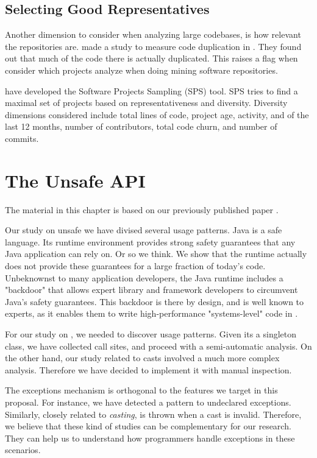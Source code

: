 \section{Selecting Good Representatives \label{org0f368d7}}
\label{sec:org61fe495}
Another dimension to consider when analyzing large codebases, is how relevant the repositories are.
\cite{lopes_dejavu:_2017} made a study to measure code duplication in \github{}.
They found out that much of the code there is actually duplicated.
This raises a flag when consider which projects analyze when doing mining software repositories. 

\cite{nagappan_diversity_2013} have developed the Software Projects Sampling (SPS) tool.
SPS tries to find a maximal set of projects based on representativeness and diversity.
Diversity dimensions considered include total lines of code, project age, activity, and of the last 12 months, number of contributors, total code churn, and number of commits.

\chapter{The Unsafe API \label{orgd4a07ae}}
\label{sec:orgf182952}

The material in this chapter is based on our previously published paper \citep{mastrangelo_use_2015}.

Our study on unsafe we have divised several usage patterns.
Java is a safe language.
Its runtime environment provides strong safety guarantees that any Java application can rely on.
Or so we think.
We show that the runtime actually does not provide these guarantees for a large fraction of today's \java{} code.
Unbeknownst to many application developers, the Java runtime includes a "backdoor" that allows expert library and framework developers to circumvent Java's safety guarantees.
This backdoor is there by design, and is well known to experts, as it enables them to write high-performance "systems-level" code in \java{}.

For our study on \smu{}, we needed to discover usage patterns.
Given its a singleton class, we have collected call sites, and proceed with a semi-automatic analysis.
On the other hand, our study related to casts involved a much more complex analysis.
Therefore we have decided to implement it with manual inspection.

The exceptions mechanism is orthogonal to the features we target in this proposal.
For instance, we have detected a \smu{} pattern to \throw{} undeclared exceptions.
Similarly, closely related to \emph{casting}, \cce{} is thrown when a cast is invalid.
Therefore, we believe that these kind of studies can be complementary for our research.
They can help us to understand how programmers handle exceptions in these scenarios.

